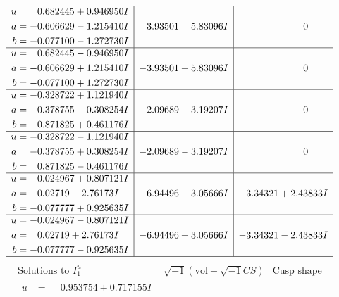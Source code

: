 \documentclass[1p]{elsarticle_modified}
\theoremstyle{definition}
\newcommand{\I}{\sqrt{-1}}
\begin{document}
$$\begin{array}{c|c|c}
\begin{aligned}
u &= \phantom{-}0.682445 + 0.946950 I \\
a &= -0.606629 - 1.215410 I \\
b &= -0.077100 - 1.272730 I\end{aligned}
 & -3.93501 - 5.83096 I & \phantom{-0.000000 } 0 \\ \hline\begin{aligned}
u &= \phantom{-}0.682445 - 0.946950 I \\
a &= -0.606629 + 1.215410 I \\
b &= -0.077100 + 1.272730 I\end{aligned}
 & -3.93501 + 5.83096 I & \phantom{-0.000000 } 0 \\ \hline\begin{aligned}
u &= -0.328722 + 1.121940 I \\
a &= -0.378755 - 0.308254 I \\
b &= \phantom{-}0.871825 + 0.461176 I\end{aligned}
 & -2.09689 + 3.19207 I & \phantom{-0.000000 } 0 \\ \hline\begin{aligned}
u &= -0.328722 - 1.121940 I \\
a &= -0.378755 + 0.308254 I \\
b &= \phantom{-}0.871825 - 0.461176 I\end{aligned}
 & -2.09689 - 3.19207 I & \phantom{-0.000000 } 0 \\ \hline\begin{aligned}
u &= -0.024967 + 0.807121 I \\
a &= \phantom{-}0.02719 - 2.76173 I \\
b &= -0.077777 + 0.925635 I\end{aligned}
 & -6.94496 - 3.05666 I & -3.34321 + 2.43833 I \\ \hline\begin{aligned}
u &= -0.024967 - 0.807121 I \\
a &= \phantom{-}0.02719 + 2.76173 I \\
b &= -0.077777 - 0.925635 I\end{aligned}
 & -6.94496 + 3.05666 I & -3.34321 - 2.43833 I\\
 \hline 
 \end{array}$$\newpage$$\begin{array}{c|c|c}  
\text{Solutions to }I^u_{1}& \I (\text{vol} + \sqrt{-1}CS) & \text{Cusp shape}\\
 \hline 
\begin{aligned}
u &= \phantom{-}0.953754 + 0.717155 I \\

\end{aligned}
\end{array}$$
\end{document}
